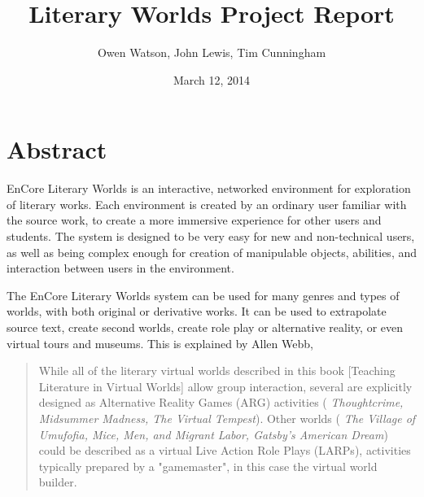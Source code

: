 \documentclass[12pt, letterpaper]{report}
\author{Owen Watson, John Lewis, Tim Cunningham}
\title{Literary Worlds Project Report}
\date{March 12, 2014}
\begin{document}
\begin{titlepage}
\Huge \maketitle \par
\end{titlepage}

%

\chapter{Abstract}
\par
EnCore Literary Worlds is an interactive, networked environment for exploration of literary works. Each environment is created by an ordinary user familiar with the source work, to create a more immersive experience for other users and students. The system is designed to be very easy for new and non-technical users, as well as being complex enough for creation of manipulable objects, abilities, and interaction between users in the environment.

\par
The EnCore Literary Worlds system can be used for many genres and types of worlds, with both original or derivative works. It can be used to extrapolate source text, create second worlds, create role play or alternative reality, or even virtual tours and museums. This is explained by Allen Webb,

\begin{quotation}
While all of the literary virtual worlds described in this book [Teaching Literature in Virtual Worlds] allow group interaction, several are explicitly designed as Alternative Reality Games (ARG) activities (%
\textit{Thoughtcrime, Midsummer Madness, The Virtual Tempest}). Other worlds (%
\textit{The Village of Umufofia, Mice, Men, and Migrant Labor, Gatsby's American Dream})
could be described as a virtual Live Action Role Plays (LARPs), activities typically prepared by a "gamemaster", in this case the virtual world builder. \cite[4]{Webb}
\end{quotation}
\end{document}
